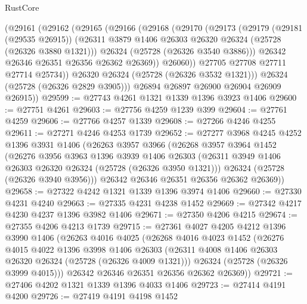 \begin{lexlean}{RustCore}
\begin{coremodule}
          (@29161
            (@29162
              (@29165
                (@29166
                  (@29168
                    (@29170
                      (@29173
                        (@29179
                          (@29181 (@29535 @26915))
                          (@26311 @3879 @1406 @26303 @26320 @26324 (@25728 (@26326 @3880 @1321)))
                          @26324
                          (@25728 (@26326 @3540 @3886)))
                        @26342
                        @26346
                        @26351
                        @26356
                        @26362
                        @26369))
                    @26060))
                @27705
                @27708
                @27711
                @27714
                @25734))
            @26320
            @26324
            (@25728 (@26326 @3532 @1321)))
          @26324
          (@25728 (@26326 @2829 @3905)))
        @26894
        @26897
        @26900
        @26904
        @26909
        @26915))
@29599 := @27743 @4261 @1321 @1339 @1396 @3923 @1406
@29600 := @27751 @4261
@29603 := @27756 @4259 @1239 @399
@29604 := @27761 @4259
@29606 := @27766 @4257 @1339
@29608 := @27266 @4246 @4255
@29611 := @27271 @4246 @4253 @1739
@29652 := @27277
    @3968
    @4245
    @4252
    @1396
    @3931
    @1406
    (@26263
      @3957
      @3966
      (@26268
        @3957
        @3964
        @1452
        (@26276
          @3956
          @3963
          @1396
          @3939
          @1406
          @26303
          (@26311 @3949 @1406 @26303 @26320 @26324 (@25728 (@26326 @3950 @1321)))
          @26324
          (@25728 (@26326 @3940 @3956)))
        @26342
        @26346
        @26351
        @26356
        @26362
        @26369))
@29658 := @27322 @4242 @1321 @1339 @1396 @3974 @1406
@29660 := @27330 @4231 @4240
@29663 := @27335 @4231 @4238 @1452
@29669 := @27342 @4217 @4230 @4237 @1396 @3982 @1406
@29671 := @27350 @4206 @4215
@29674 := @27355 @4206 @4213 @1739
@29715 := @27361
    @4027
    @4205
    @4212
    @1396
    @3990
    @1406
    (@26263
      @4016
      @4025
      (@26268
        @4016
        @4023
        @1452
        (@26276
          @4015
          @4022
          @1396
          @3998
          @1406
          @26303
          (@26311 @4008 @1406 @26303 @26320 @26324 (@25728 (@26326 @4009 @1321)))
          @26324
          (@25728 (@26326 @3999 @4015)))
        @26342
        @26346
        @26351
        @26356
        @26362
        @26369))
@29721 := @27406 @4202 @1321 @1339 @1396 @4033 @1406
@29723 := @27414 @4191 @4200
@29726 := @27419 @4191 @4198 @1452

\end{coremodule}
\end{lexlean}
